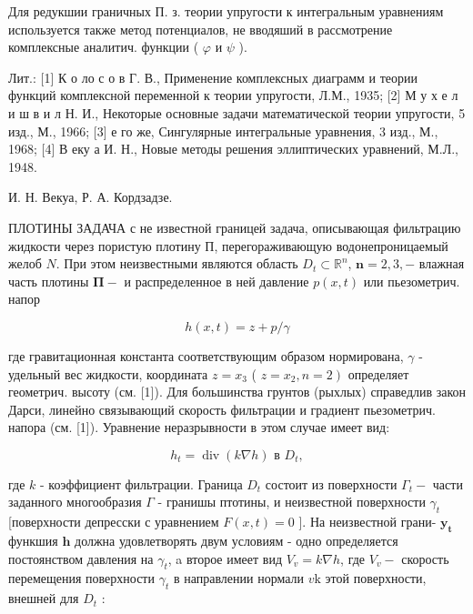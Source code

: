 \documentclass[10pt]{article}
\begin{document}
Для редукшии граничных П. з. теории упругости к интегральным уравнениям используется также метод потенциалов, не вводяший в рассмотрение комплексные аналитич. функции ( $\varphi$ и $\psi$ ).



Лит.: [1] К о ло с о в Г. В., Применение комплексных диаграмм и теории функций комплексной переменной к теории упругости, Л.М., 1935; [2] М у х е л и ш в и л Н. И., Некоторые основные задачи математической теории упругости, 5 изд., М., 1966; [3] е го же, Сингулярные интегральные уравнения, 3 изд., М., 1968; [4] В еку а И. Н., Новые методы решения эллиптических уравнений, М.Л., 1948.



И. Н. Векуа, Р. А. Кордзадзе.



ПЛОТИНЫ ЗАДАЧА с не известной границей задача, описывающая фильтрацию жидкости через пористую плотину П, перегораживающую водонепроницаемый желоб $N$. При этом неизвестными являются область $D_{t} \subset \mathbb{R}^{n}$, $\boldsymbol{n}=2,3,-$ влажная часть плотины $\boldsymbol{\Pi}-$ и распределенное в ней давление $p(x, t)$ или пьезометрич. напор



\[

h(x, t)=z+p / \gamma

\]



где гравитационная константа соответствующим образом нормирована, $\gamma$ - удельный вес жидкости, координата $z=x_{3}$ ( $\left.z=x_{2}, n=2\right)$ определяет геометрич. высоту (см. [1]). Для большинства грунтов (рыхлых) справедлив закон Дарси, линейно связывающий скорость фильтрации и градиент пьезометрич. напора (см. [1]). Уравнение неразрывности в этом случае имеет вид:



\[

h_{t}=\operatorname{div}(k \nabla h) \text { в } D_{t},

\]



где $k$ - коэффициент фильтрации. Граница $D_{t}$ состоит из поверхности $\Gamma_{t}-$ части заданного многообразия $\Gamma$ - гранишы птотины, и неизвестной поверхности $\gamma_{t}$ [поверхности депресски с уравнением $F(x, t)=0$ ]. На неизвестной грани- $\boldsymbol{y}_{\boldsymbol{t}}$ функшия $\boldsymbol{h}$ должна удовлетворять двум условиям - одно определяется постоянством давления на $\gamma_{t}$, a второе имеет вид $V_{v}=k \nabla h$, где $V_{v}-$ скорость перемещения поверхности $\gamma_{t}$ в направлении нормали $v \mathrm{k}$ этой поверхности, внешней для $D_{t}$ :
\end{document}
